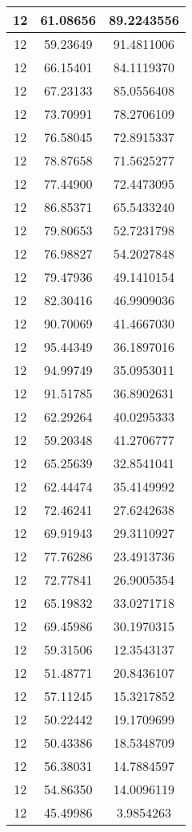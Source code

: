 \documentclass[
]{book}
\begin{document}
\begin{tabular}{c|c|c}
\hline
12 & 61.08656 & 89.2243556\\
\hline
12 & 59.23649 & 91.4811006\\
\hline
12 & 66.15401 & 84.1119370\\
\hline
12 & 67.23133 & 85.0556408\\
\hline
12 & 73.70991 & 78.2706109\\
\hline
12 & 76.58045 & 72.8915337\\
\hline
12 & 78.87658 & 71.5625277\\
\hline
12 & 77.44900 & 72.4473095\\
\hline
12 & 86.85371 & 65.5433240\\
\hline
12 & 79.80653 & 52.7231798\\
\hline
12 & 76.98827 & 54.2027848\\
\hline
12 & 79.47936 & 49.1410154\\
\hline
12 & 82.30416 & 46.9909036\\
\hline
12 & 90.70069 & 41.4667030\\
\hline
12 & 95.44349 & 36.1897016\\
\hline
12 & 94.99749 & 35.0953011\\
\hline
12 & 91.51785 & 36.8902631\\
\hline
12 & 62.29264 & 40.0295333\\
\hline
12 & 59.20348 & 41.2706777\\
\hline
12 & 65.25639 & 32.8541041\\
\hline
12 & 62.44474 & 35.4149992\\
\hline
12 & 72.46241 & 27.6242638\\
\hline
12 & 69.91943 & 29.3110927\\
\hline
12 & 77.76286 & 23.4913736\\
\hline
12 & 72.77841 & 26.9005354\\
\hline
12 & 65.19832 & 33.0271718\\
\hline
12 & 69.45986 & 30.1970315\\
\hline
12 & 59.31506 & 12.3543137\\
\hline
12 & 51.48771 & 20.8436107\\
\hline
12 & 57.11245 & 15.3217852\\
\hline
12 & 50.22442 & 19.1709699\\
\hline
12 & 50.43386 & 18.5348709\\
\hline
12 & 56.38031 & 14.7884597\\
\hline
12 & 54.86350 & 14.0096119\\
\hline
12 & 45.49986 & 3.9854263\\

\end{tabular}
\end{document}
